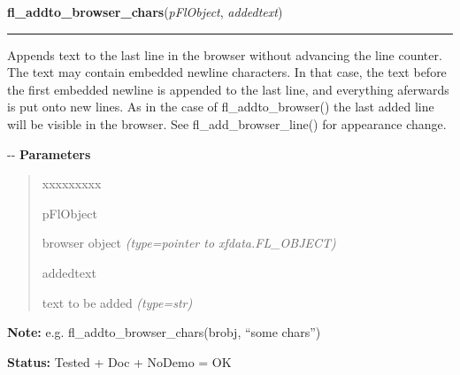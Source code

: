 \hspace{.8\funcindent}\begin{boxedminipage}{\funcwidth}

    \raggedright \textbf{fl\_addto\_browser\_chars}(\textit{pFlObject}, \textit{addedtext})

    \vspace{-1.5ex}

    \rule{\textwidth}{0.5\fboxrule}
\setlength{\parskip}{2ex}

Appends text to the last line in the browser without advancing the
line counter. The text may contain embedded newline characters. In that
case, the text before the first embedded newline is appended to the last
line, and everything aferwards is put onto new lines. As in the case of
fl\_addto\_browser() the last added line will be visible in the browser.
See fl\_add\_browser\_line() for appearance change.

-{}-
\setlength{\parskip}{1ex}
      \textbf{Parameters}
      \vspace{-1ex}

      \begin{quote}
        \begin{Ventry}{xxxxxxxxx}

          \item[pFlObject]


browser object
            {\it (type=pointer to xfdata.FL\_OBJECT)}

          \item[addedtext]


text to be added
            {\it (type=str)}

        \end{Ventry}

      \end{quote}

\textbf{Note:} 
e.g. fl\_addto\_browser\_chars(brobj, ``some chars'')


\textbf{Status:} 
Tested + Doc + NoDemo = OK


    \end{boxedminipage}

    \label{xformslib:flbrowser:fl_addto_browser_chars}

    \vspace{0.5ex}

